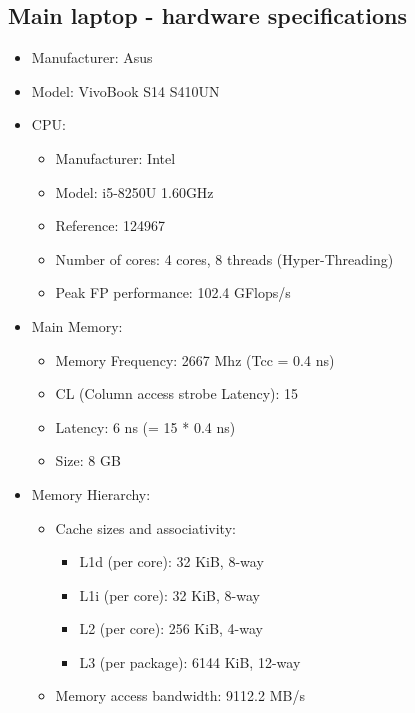 \documentclass{article}
\begin{document}
\begin{appendices}
\subsection{Main laptop - hardware specifications}
\label{laptop_hardware_desc}
\begin{itemize}
    \item Manufacturer: Asus
    \item Model: VivoBook S14 S410UN
    \item CPU:
        \begin{itemize}
            \item Manufacturer: Intel
            \item Model: i5-8250U 1.60GHz
            \item Reference: 124967
            \item Number of cores: 4 cores, 8 threads (Hyper-Threading)
            \item Peak FP performance: 102.4 GFlops/s ~\cite{flops,flopsCalc}
        \end{itemize}
    \item Main Memory:
        \begin{itemize}
            \item Memory Frequency: 2667 Mhz (Tcc = 0.4 ns)
            \item CL (Column access strobe Latency): 15
            \item Latency: 6 ns (= 15 * 0.4 ns)
            \item Size: 8 GB
        \end{itemize}
    \item Memory Hierarchy:
        \begin{itemize}
            \item Cache sizes and associativity:
                \begin{itemize}
                    \item L1d (per core): 32 KiB, 8-way
                    \item L1i (per core): 32 KiB, 8-way
                    \item L2 (per core): 256 KiB, 4-way
                    \item L3 (per package): 6144 KiB, 12-way
                \end{itemize}
            \item Memory access bandwidth: 9112.2 MB/s 
        \end{itemize}
\end{itemize}

\end{appendices}
\end{document}
